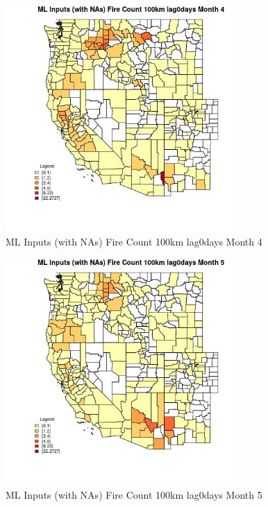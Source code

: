 \begin{figure} 
\centering  
\includegraphics[width=0.77\textwidth]{Code_Outputs/Report_ML_input_PM25_Step4_part_f_de_duplicated_aveswNAs_CountyFire_Count_100km_lag0daysmedianMonth4.jpg} 
\caption{\label{fig:Report_ML_input_PM25_Step4_part_f_de_duplicated_aveswNAsCountyFire_Count_100km_lag0daysmedianMonth4}ML Inputs (with NAs) Fire Count 100km lag0days Month 4} 
\end{figure} 
 

\begin{figure} 
\centering  
\includegraphics[width=0.77\textwidth]{Code_Outputs/Report_ML_input_PM25_Step4_part_f_de_duplicated_aveswNAs_CountyFire_Count_100km_lag0daysmedianMonth5.jpg} 
\caption{\label{fig:Report_ML_input_PM25_Step4_part_f_de_duplicated_aveswNAsCountyFire_Count_100km_lag0daysmedianMonth5}ML Inputs (with NAs) Fire Count 100km lag0days Month 5} 
\end{figure} 
 

